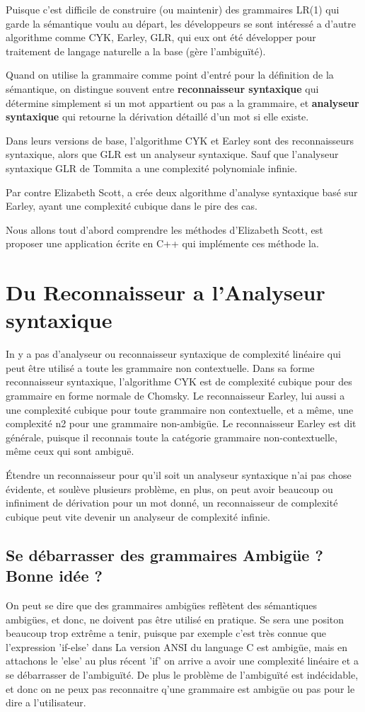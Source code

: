 \documentclass[10pt]{report}
\begin{document}
Puisque c'est difficile de construire (ou maintenir) des grammaires LR(1) qui garde la sémantique voulu au départ, les développeurs se sont intéressé a d'autre algorithme comme CYK\cite{Younger}, Earley\cite{Earley}, GLR\cite{Tomita}, qui eux ont été développer pour traitement de langage naturelle a la base (gère l'ambiguïté).

Quand on utilise la grammaire comme point d'entré pour la définition de la sémantique, on distingue souvent entre \textbf{reconnaisseur syntaxique} qui détermine simplement si un mot appartient ou pas a la grammaire, et \textbf{analyseur syntaxique} qui retourne la dérivation détaillé d'un mot si elle existe.

Dans leurs versions de base, l'algorithme CYK et Earley sont des reconnaisseurs syntaxique, alors que GLR est un analyseur syntaxique. Sauf que l'analyseur syntaxique GLR de Tommita a une complexité polynomiale infinie.

Par contre Elizabeth Scott\cite{Scott}, a crée deux algorithme d'analyse syntaxique basé sur Earley, ayant une complexité cubique dans le pire des cas.

Nous allons tout d'abord comprendre les méthodes d'Elizabeth Scott, est proposer une application écrite en C++ qui implémente ces méthode la.

\chapter{Du Reconnaisseur a l'Analyseur syntaxique}
In y a pas d'analyseur ou reconnaisseur syntaxique de complexité linéaire qui peut être utilisé a toute les grammaire non contextuelle. Dans sa forme reconnaisseur syntaxique, l'algorithme CYK est de complexité cubique pour des grammaire en forme normale de Chomsky. Le reconnaisseur Earley, lui aussi a une complexité cubique pour toute grammaire non contextuelle, et a même, une complexité n2 pour une grammaire non-ambigüe. Le reconnaisseur Earley est dit générale, puisque il reconnais toute la catégorie grammaire non-contextuelle, même ceux qui sont ambiguë.

Étendre un reconnaisseur pour qu'il soit un analyseur syntaxique n'ai pas chose évidente, et soulève plusieurs problème, en plus, on peut avoir beaucoup ou infiniment de dérivation pour un mot donné, un reconnaisseur de complexité cubique peut vite devenir un analyseur de complexité infinie.

\section{Se débarrasser des grammaires Ambigüe ? Bonne idée ?}
On peut se dire que des grammaires ambigües reflètent des sémantiques ambigües, et donc, ne doivent pas être utilisé en pratique. Se sera une positon beaucoup trop extrême a tenir, puisque par exemple c'est très connue que l'expression 'if-else' dans La version ANSI du language C est ambigüe, mais en attachons le 'else' au plus récent 'if' on arrive a avoir une complexité linéaire et a se débarrasser de l'ambiguïté.
De plus le problème de l'ambiguïté est indécidable\cite{Hopcroft}, et donc on ne peux pas reconnaitre q'une grammaire est ambigüe ou pas pour le dire a l'utilisateur.
 
\end{document}
